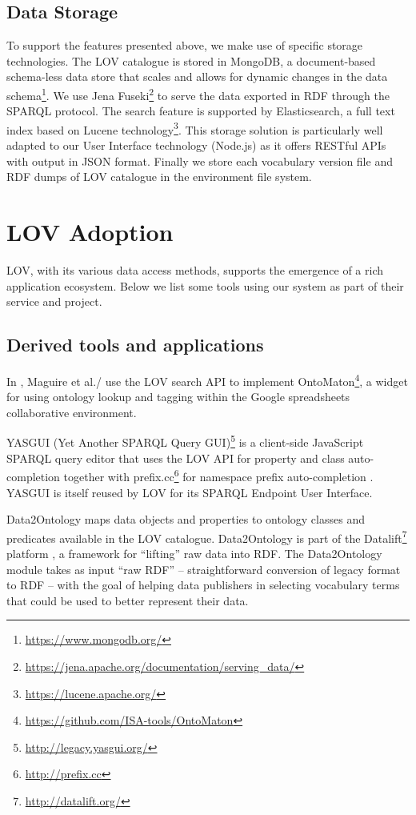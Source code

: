 \documentclass{iosart2c}
\begin{document}
\subsection{Data Storage}

To support the features presented above, we make use of specific storage technologies. The LOV catalogue is stored in MongoDB\textregistered, a document-based schema-less data store that scales and allows for dynamic changes in the data schema\footnote{\url{https://www.mongodb.org/}}. We use Jena Fuseki\footnote{\url{https://jena.apache.org/documentation/serving_data/}} to serve the data exported in RDF through the SPARQL protocol. The search feature is supported by Elasticsearch\textregistered, a full text index based on Lucene technology\footnote{\url{https://lucene.apache.org/}}. This storage solution is particularly well adapted to our User Interface technology (Node.js) as it offers RESTful APIs with output in JSON format. Finally we store each vocabulary version file and RDF dumps of LOV catalogue in the environment file system.



\section{LOV Adoption}\label{sec:lovecosystem}
LOV, with its various data access methods, supports the emergence of a rich application ecosystem. Below we list some tools using our system as part of their service and project.
 
\subsection{Derived tools and applications}

In \cite{ontomaton12}, Maguire et al./ use the LOV search API to implement OntoMaton\footnote{\url{https://github.com/ISA-tools/OntoMaton}}, a widget for using ontology lookup and tagging within the Google spreadsheets collaborative environment. 

YASGUI (Yet Another SPARQL Query GUI)\footnote{\url{http://legacy.yasgui.org/}} is a client-side JavaScript SPARQL query editor that uses the LOV API for property and class auto-completion together with prefix.cc\footnote{\url{http://prefix.cc}} for namespace prefix auto-completion \cite{yasgui}. YASGUI is itself reused by LOV for its SPARQL Endpoint User Interface.

Data2Ontology maps data objects and properties to ontology classes and predicates available in the LOV catalogue. Data2Ontology is part of the  Datalift\footnote{\url{http://datalift.org/}} platform \cite{scharffe_2012}, a framework for ``lifting'' raw data into RDF. The Data2Ontology module takes as input ``raw RDF'' -- straightforward conversion of legacy format to RDF -- with the goal of helping data publishers in selecting vocabulary terms that could be used to better represent their data.
\end{document}
